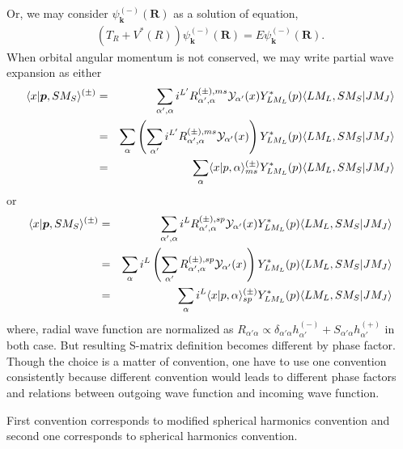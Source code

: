 \documentclass[10pt]{book}
\def\bm{\boldsymbol}
\newcommand{\bea}{\begin{eqnarray}}
\newcommand{\eea}{\end{eqnarray}}
\newcommand{\no}{\nonumber \\}
\def\vp{{\bm p}}
\def\vk{{\bm k}}
\def\vR{{\bm R}}
\def\la{\langle}
\def\ra{\rangle}
\begin{document}
Or, we may consider $\psi^{(-)}_{\vk}(\vR)$ as a solution of equation,
\bea 
(T_R+V^*(R))\psi^{(-)}_{\vk}(\vR)=E\psi^{(-)}_{\vk}(\vR).
\eea 
When orbital angular momentum is not conserved, we may write 
partial wave expansion as either
\bea 
\la x|\vp, S M_S\ra^{(\pm)}&=&\sum_{\alpha',\alpha} i^{L'} R^{(\pm),ms}_{\alpha',\alpha} 
              {\cal Y}_{\alpha'}(x) Y^*_{L M_L}(p) \la L M_L, S M_S|J M_J\ra \no 
            &=&\sum_{\alpha} \left( \sum_{\alpha'} i^{L'} R^{(\pm),ms}_{\alpha',\alpha} 
                          {\cal Y}_{\alpha'}(x) \right) Y^*_{L M_L}(p) \la L M_L, S M_S|J M_J\ra
                          \no 
            &=& \sum_{\alpha} \la x|p,\alpha\ra^{(\pm)}_{ms} 
            Y^*_{L M_L}(p) \la L M_L, S M_S|J M_J\ra             
\eea 
or
\bea 
\la x|\vp, S M_S\ra^{(\pm)}&=&\sum_{\alpha',\alpha} i^{L} R^{(\pm),sp}_{\alpha',\alpha} 
              {\cal Y}_{\alpha'}(x) Y^*_{LM_L}(p) \la L M_L, S M_S|J M_J\ra \no 
          &=&\sum_{\alpha} i^{L} 
            \left( \sum_{\alpha'} R^{(\pm),sp}_{\alpha',\alpha} 
                        {\cal Y}_{\alpha'}(x)\right)  
                        Y^*_{LM_L}(p) \la L M_L, S M_S|J M_J\ra \no     
          &=&\sum_{\alpha} i^{L} \la x|p,\alpha\ra^{(\pm)}_{sp}  
            Y^*_{LM_L}(p) \la L M_L, S M_S|J M_J\ra                     
\eea 
where, radial wave function are normalized as
$R_{\alpha'\alpha}\propto \delta_{\alpha'\alpha} h^{(-)}_{\alpha'} +S_{\alpha'\alpha} h^{(+)}_{\alpha'}$
in both case. But resulting S-matrix definition becomes different by phase factor. 
Though the choice is a matter of convention, one have to use one convention
consistently because different convention would leads to different phase factors
and relations between outgoing wave function and incoming wave function. 

First convention corresponds to modified spherical harmonics convention
and second one corresponds to spherical harmonics convention. 
\end{document}
